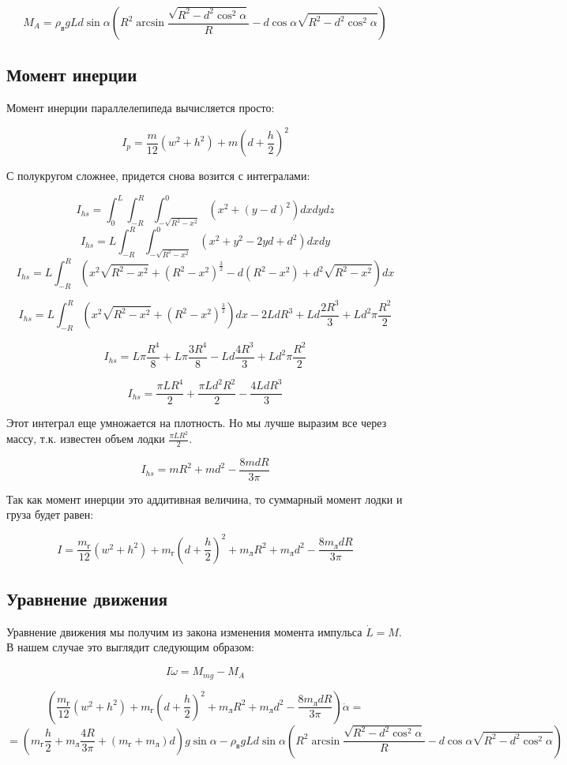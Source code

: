 \documentclass[a4paper]{article}
\begin{document}
$$ M_A = \rho_\text{в}gLd\sin\alpha (R^2 \arcsin\frac{\sqrt{R^2-d^2\cos^2\alpha}}{R} - d\cos\alpha\sqrt{R^2-d^2\cos^2\alpha}) $$

\subsection{Момент инерции}

Момент инерции параллелепипеда вычисляется просто:

$$ I_p = \frac{m}{12}(w^2 + h^2) + m(d + \frac{h}{2})^2 $$

С полукругом сложнее, придется снова возится с интегралами:

$$ I_{hs} = \int_0^L \int_{-R}^{R} \int_{-\sqrt{R^2 - x^2}}^0 (x^2 + (y-d)^2) dx dy dz $$
$$ I_{hs} = L \int_{-R}^{R} \int_{-\sqrt{R^2 - x^2}}^0 (x^2 + y^2 -2yd + d^2) dx dy $$
$$ I_{hs} = L \int_{-R}^{R} (x^2 \sqrt{R^2 - x^2} + (R^2 - x^2)^\frac{3}{2} - d(R^2 - x^2) + d^2 \sqrt{R^2 - x^2}) dx $$

$$ I_{hs} = L \int_{-R}^{R} (x^2 \sqrt{R^2 - x^2} + (R^2 - x^2)^\frac{3}{2}) dx - 2LdR^3 + Ld\frac{2R^3}{3} + Ld^2\pi\frac{R^2}{2} $$

$$ I_{hs} = L\pi\frac{R^4}{8} + L\pi\frac{3R^4}{8} - Ld\frac{4R^3}{3} + Ld^2\pi\frac{R^2}{2} $$

$$ I_{hs} = \frac{\pi LR^4}{2} + \frac{\pi Ld^2R^2}{2} - \frac{4LdR^3}{3} $$

Этот интеграл еще умножается на плотность. Но мы лучше выразим все через массу, т.к. известен объем лодки $\frac{\pi LR^2}{2}$.

$$ I_{hs} = mR^2 + md^2 - \frac{8mdR}{3\pi}$$

Так как момент инерции это аддитивная величина, то суммарный момент лодки и груза будет равен:

$$ I = \frac{m_\text{г}}{12}(w^2 + h^2) + m_\text{г}(d + \frac{h}{2})^2 + m_\text{л}R^2 + m_\text{л}d^2 - \frac{8m_\text{л}dR}{3\pi}$$

\subsection{Уравнение движения}

Уравнение движения мы получим из закона изменения момента импульса $\dot{L} = M$. В нашем случае это выглядит следующим образом:

$$ I\dot{\omega} = M_{mg} - M_A $$

$$ (\frac{m_\text{г}}{12}(w^2 + h^2) + m_\text{г}(d + \frac{h}{2})^2 + m_\text{л}R^2 + m_\text{л}d^2 - \frac{8m_\text{л}dR}{3\pi})\ddot{\alpha} = $$
$$ = (m_\text{г}\frac{h}{2} + m_\text{л}\frac{4R}{3\pi} + (m_\text{г} + m_\text{л})d)g\sin\alpha -  \rho_\text{в}gLd\sin\alpha (R^2 \arcsin\frac{\sqrt{R^2-d^2\cos^2\alpha}}{R} - d\cos\alpha\sqrt{R^2-d^2\cos^2\alpha}) $$
\end{document}
